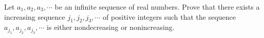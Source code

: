 Let $a_1, a_2, a_3, \cdots$ be an infinite sequence of real numbers.  Prove that there exists a increasing sequence $j_1, j_2, j_3, \cdots$ of positive integers such that the sequence $a_{j_1}, a_{j_2}, a_{j_3}, \cdots$ is either nondecreasing or nonincreasing.